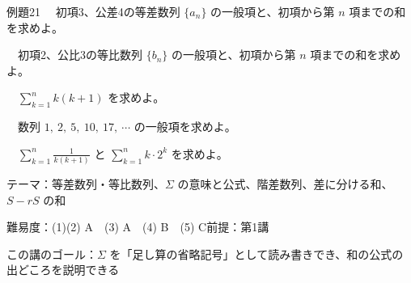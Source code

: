\documentclass[paper=b5j, fontsize=8pt, fleqn, twoside]{jlreq}
\begin{document}
\begin{ascolorbox4A}[出典：オリジナル]{例題21}
  　初項3、公差4の等差数列 $\{a_n\}$ の一般項と、初項から第 $n$ 項までの和を求めよ。\par
  　初項2、公比3の等比数列 $\{b_n\}$ の一般項と、初項から第 $n$ 項までの和を求めよ。\par
  　$\displaystyle\sum_{k=1}^nk(k+1)$ を求めよ。\par
  　数列 $1,\ 2,\ 5,\ 10,\ 17,\ \cdots$ の一般項を求めよ。\par
  　$\displaystyle\sum_{k=1}^n\frac1{k(k+1)}$ と $\displaystyle\sum_{k=1}^nk\cdot2^k$ を求めよ。
\end{ascolorbox4A}

\begin{Data}
  テーマ：等差数列・等比数列、$\Sigma$ の意味と公式、階差数列、差に分ける和、$S-rS$ の和\par
  難易度：(1)(2) A　(3) A　(4) B　(5) C\quad 前提：第1講\par
  この講のゴール：$\Sigma$ を「足し算の省略記号」として読み書きでき、和の公式の出どころを説明できる
\end{Data}
\end{document}
